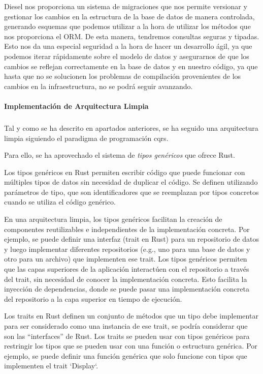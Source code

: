 Diesel nos proporciona un sistema de migraciones que nos permite versionar y gestionar los cambios en la estructura de la base de datos de manera controlada, generando esquemas que podemos utilizar a la hora de utilizar los métodos que nos proporciona el ORM. De esta manera, tendremos consultas seguras y tipadas.
Esto nos da una especial seguridad a la hora de hacer un desarrollo ágil, ya que podemos iterar rápidamente sobre el modelo de datos y asegurarnos de que los cambios se reflejan correctamente en la base de datos y en nuestro código, ya que hasta que no se solucionen los problemas de compilación provenientes de los cambios en la infraestructura, no se podrá seguir avanzando.

\paragraph{Implementación de Arquitectura Limpia}
\subparagraph{}

Tal y como se ha descrito en apartados anteriores, se ha seguido una arquitectura limpia siguiendo el paradigma de programación \acrshort{cqrs}.

Para ello, se ha aprovechado el sistema de \textit{tipos genéricos} que ofrece Rust.

Los tipos genéricos en Rust permiten escribir código que puede funcionar con múltiples tipos de datos sin necesidad de duplicar el código. Se definen utilizando parámetros de tipo, que son identificadores que se reemplazan por tipos concretos cuando se utiliza el código genérico.

En una arquitectura limpia, los tipos genéricos facilitan la creación de componentes reutilizables e independientes de la implementación concreta. Por ejemplo, se puede definir una interfaz (trait en Rust) para un repositorio de datos y luego implementar diferentes repositorios (e.g., uno para una base de datos y otro para un archivo) que implementen ese trait. Los tipos genéricos permiten que las capas superiores de la aplicación interactúen con el repositorio a través del trait, sin necesidad de conocer la implementación concreta. Esto facilita la inyección de dependencias, donde se puede pasar una implementación concreta del repositorio a la capa superior en tiempo de ejecución.

Los traits en Rust definen un conjunto de métodos que un tipo debe implementar para ser considerado como una instancia de ese trait, se podría considerar que son las ``interfaces'' de Rust. Los traits se pueden usar con tipos genéricos para restringir los tipos que se pueden usar con una función o estructura genérica. Por ejemplo, se puede definir una función genérica que solo funcione con tipos que implementen el trait `Display`.


